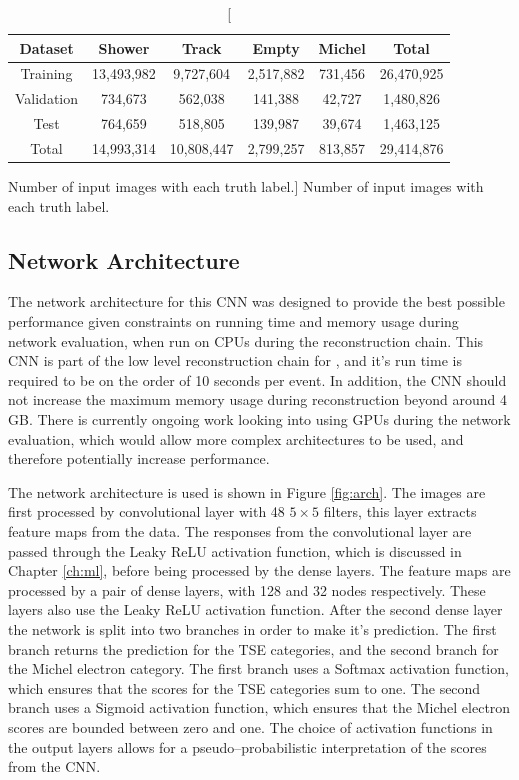 \begin{table}
	\centering
	\begin{tabular}{c|c|c|c|c|c}
		Dataset    & Shower     & Track      & Empty     & Michel  & Total      \\ \hline
		Training   & 13,493,982 & 9,727,604  & 2,517,882 & 731,456 & 26,470,925 \\
		Validation & 734,673    & 562,038    & 141,388   & 42,727  & 1,480,826  \\
		Test       & 764,659    & 518,805    & 139,987   & 39,674  & 1,463,125  \\ \hline
		Total      & 14,993,314 & 10,808,447 & 2,799,257 & 813,857 & 29,414,876
	\end{tabular}
	\caption
	[Number of input images with each truth label.]
	{Number of input images with each truth label.}
	\label{tab:patches}
\end{table}

\subsection{Network Architecture}

The network architecture for this CNN was designed to provide the best possible
performance given constraints on running time and memory usage during network
evaluation, when run on CPUs during the \protodune{} reconstruction chain. 
This CNN is part of the low level reconstruction chain for \protodune{}, and 
it's run time is required to be on the order of 10 seconds per event. In 
addition, the CNN should not increase the maximum memory usage during 
reconstruction beyond around 4 GB. There is currently ongoing work looking 
into using GPUs during the network evaluation, which would allow more complex 
architectures to be used, and therefore potentially increase performance.

The network architecture is used is shown in Figure \ref{fig:arch}. The images
are first processed by convolutional layer with 48 $5 \times 5$ filters, this
layer extracts feature maps from the data. The responses from the 
convolutional layer are passed through the Leaky ReLU activation function, which
is discussed in Chapter \ref{ch:ml}, before being processed by the dense 
layers. The feature maps are processed by a pair of dense layers, with 128 and 
32 nodes respectively. These layers also use the Leaky ReLU activation
function. After the second dense layer the network is split into two branches in
order to make it's prediction. The first branch returns the prediction for the 
TSE categories, and the second branch for the Michel electron category. The 
first branch uses a Softmax activation function, which ensures that the scores 
for the TSE categories sum to one.  The second branch uses a Sigmoid 
activation function, which ensures that the Michel electron scores are bounded 
between zero and one. The choice of activation functions in the output layers 
allows for a pseudo--probabilistic interpretation of the scores from the CNN.

